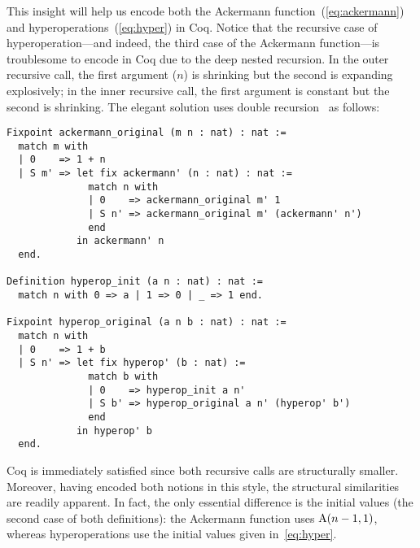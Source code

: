 This insight will help us encode both the Ackermann function~(\eqref{eq:ackermann}) and hyperoperations~(\eqref{eq:hyper}) in Coq.  Notice that the recursive case of hyperoperation---and
indeed, the third case of the Ackermann function---is troublesome to encode in Coq due to
the deep nested recursion.  In the outer recursive call, the first argument ($n$) is shrinking
but the second is expanding explosively; in the inner recursive call, the first argument is
constant but the second is shrinking. The elegant solution uses double recursion~\cite{someone?} as follows:
\begin{lstlisting}
Fixpoint ackermann_original (m n : nat) : nat :=
  match m with
  | 0    => 1 + n
  | S m' => let fix ackermann' (n : nat) : nat :=
              match n with
              | 0    => ackermann_original m' 1
              | S n' => ackermann_original m' (ackermann' n')
              end
            in ackermann' n
  end.

Definition hyperop_init (a n : nat) : nat :=
  match n with 0 => a | 1 => 0 | _ => 1 end.

Fixpoint hyperop_original (a n b : nat) : nat :=
  match n with
  | 0    => 1 + b
  | S n' => let fix hyperop' (b : nat) :=
              match b with
              | 0    => hyperop_init a n'
              | S b' => hyperop_original a n' (hyperop' b')
              end
            in hyperop' b
  end.
\end{lstlisting}
Coq is immediately satisfied since both recursive calls are structurally smaller.
Moreover, having encoded both notions in this style, the structural similarities
are readily apparent.  In fact, the only essential difference is the initial values
(the second case of both definitions): the Ackermann function uses $\text{A}(n-1,1)$, whereas
hyperoperations use the initial values given in~\eqref{eq:hyper}.


